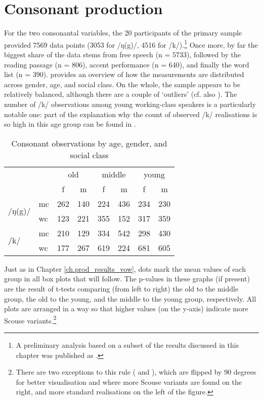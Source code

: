 \chapter{Consonant production}
\label{prod.res.con}

For the two consonantal variables, the 20 participants of the primary sample provided 7569 data points (3053 for /ŋ(g)/, 4516 for /k/).\footnote{A preliminary analysis based on a subset of the results discussed in this chapter was published as \citealt{juskanaccentrevivallipp}.}
Once more, by far the biggest share of the data stems from free speech (n = 5733), followed by the reading passage (n = 806), accent performance (n = 640), and finally the word list (n = 390).
 provides an overview of how the measurements are distributed across gender, age, and social class.
On the whole, the sample appears to be relatively balanced, although there are a couple of `outliers' (cf. also ).
The number of /k/ observations among young working-class speakers is a particularly notable one: part of the explanation why the count of observed /k/ realisations is so high in this age group can be found in .

\begin{table}[h!]
	\centering
	\caption{Consonant observations by age, gender, and social class}
	\label{tab.consonants.n.observations}
	\begin{tabular}{llcccccc}
		\toprule
		\multicolumn{2}{c}{} & \multicolumn{2}{c}{old} & \multicolumn{2}{c}{middle} & \multicolumn{2}{c}{young}\\
		& & f & m & f & m & f & m\\
		\midrule
		\multirow{2}{*}{/ŋ(g)/} & mc & 262 & 140 & 224 & 436 & 234 & 230\\
		& wc & 123 & 221 & 355 & 152 & 317 & 359\\
		\multirow{2}{*}{/k/} & mc & 210 & 129 & 334 & 542 & 298 & 430\\
		& wc & 177 & 267 & 619 & 224 & 681 & 605\\
		\bottomrule
	\end{tabular}
\end{table}

Just as in Chapter \ref{ch.prod_results_vow}, dots mark the mean values of each group in all box plots that will follow.
The p-values in these graphs (if present) are the result of t-tests comparing (from left to right) the old to the middle group, the old to the young, and the middle to the young group, respectively.
All plots are arranged in a way so that higher values (on the y-axis) indicate more Scouse variants.\footnote{There are two exceptions to this rule ( and ), which are flipped by 90 degrees for better visualisation and where more Scouse variants are found on the right, and more standard realisations on the left of the figure.}



